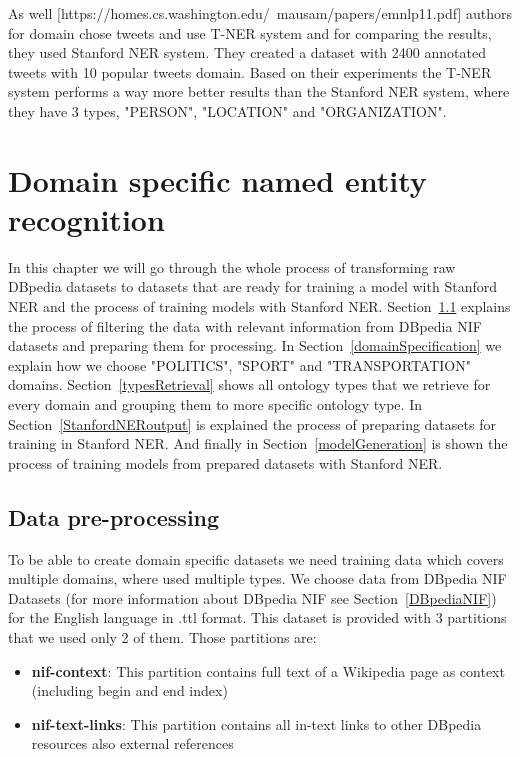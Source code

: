 \documentclass[thesis=M,english]{FITthesis}[2018/05/30]
\begin{document}
 As well [https://homes.cs.washington.edu/~mausam/papers/emnlp11.pdf] authors for domain chose tweets and use T-NER system and for comparing the results, they used Stanford NER system. They created a dataset with 2400 annotated tweets with 10 popular tweets domain. Based on their experiments the T-NER system performs a way more better results than the Stanford NER system, where they have 3 types, "PERSON", "LOCATION" and "ORGANIZATION". 



\chapter{Domain specific named entity recognition}\label{}
	In this chapter we will go through the whole process of transforming raw DBpedia datasets to datasets that are ready for training a model with Stanford NER and the process of training models with Stanford NER. Section~\ref{dataPreProcessing} explains the process of filtering the data with relevant information from DBpedia NIF datasets and preparing them for processing. In Section~\ref{domainSpecification} we explain how we choose "POLITICS", "SPORT" and "TRANSPORTATION" domains. Section~\ref{typesRetrieval} shows all ontology types that we retrieve for every domain and grouping them to more specific ontology type. In Section~\ref{StanfordNERoutput} is explained the process of preparing datasets for training in Stanford NER. And finally in Section~\ref{modelGeneration} is shown the process of training models from prepared datasets with Stanford NER.  

\section{Data pre-processing}\label{dataPreProcessing}
	To be able to create domain specific datasets we need training data which covers multiple domains, where used multiple types. We choose data from DBpedia NIF Datasets (for more information about DBpedia NIF see Section~\ref{DBpediaNIF}) for the English language in .ttl format. This dataset is provided with 3 partitions that we used only 2 of them. Those partitions are:
	\begin{itemize}
		\item \textbf{nif-context}: This partition contains full text of a Wikipedia page as context (including begin and end index)
		\item \textbf{nif-text-links}: This partition contains all in-text links to other DBpedia resources also external references
	\end{itemize}	 
\end{document}
